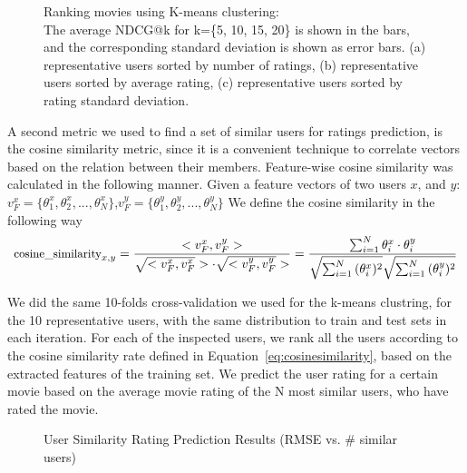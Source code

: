 \begin{figure}
{\begin{tabular}{ c c c}
\end{tabular}
}
\caption{Ranking movies using K-means clustering: 
\\The average NDCG@k for k=\{5, 10, 15, 20\} is shown in the bars, and the corresponding standard deviation is shown as error bars. (a) representative users sorted by number of ratings, (b) representative users sorted by average rating, (c) representative users sorted by rating standard deviation. }
\label{fig:ndcg}  
\end{figure}


A second metric we used to find a set of similar users for ratings prediction, is the cosine similarity metric, since it is a convenient technique to correlate vectors based on the relation between their members.
Feature-wise cosine similarity was calculated in the following manner. Given a feature vectors of two users $x$, and $y$: $v^x_{F}=\{\theta^x_{1},\theta^x_{2},...,\theta^x_{N}\}$,$v^y_{F}=\{\theta^y_{1},\theta^y_{2},...,\theta^y_{N}\}$
We define the cosine similarity in the following way
\begin{equation}
\footnotesize
\text{cosine\_similarity}_{x,y} = \frac{<v^x_{F},v^y_{F}>}{\sqrt{<v^x_{F},v^x_{F}}> \cdot \sqrt{<v^y_{F},v^y_{F}}>}=\frac{\sum^N_{i=1}{\theta^x_i \cdot \theta^y_i}}{{\sqrt{\sum^N_{i=1}{(\theta^x_i)^2} }}\sqrt{\sum^N_{i=1}{(\theta^y_i)^2 }}}
\label{eq:cosinesimilarity}
\end{equation}

We did the same 10-folds cross-validation we used for the k-means clustring, for the 10 representative users, with the same distribution to train and test sets in each iteration. For each of the inspected users, we rank all the users according to the cosine similarity rate defined in Equation~\ref{eq:cosinesimilarity}, based on the extracted features of the training set.
We predict the user rating for a certain movie based on the average movie rating of the N most similar users, who have rated the movie.

\begin{figure}
\center
{}
\caption{User Similarity Rating Prediction Results (RMSE vs. \# similar users)}
\label{fig:user_similarity}  
\end{figure}


